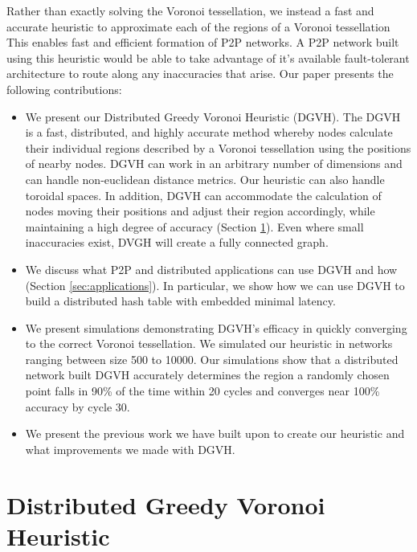 \documentclass[11pt, conference, letterpaper]{IEEEtran}
\begin{document}
Rather than exactly solving the Voronoi tessellation, we instead a fast and accurate heuristic to approximate each of the regions of a Voronoi tessellation
This enables fast and efficient formation of P2P networks.
A P2P network built using this heuristic would be able to take advantage of it's available fault-tolerant architecture to route along any inaccuracies that arise.
Our paper presents the following contributions:
\begin{itemize}
	\item We present our Distributed Greedy Voronoi Heuristic (DGVH). 
	The DGVH is a fast, distributed, and highly accurate method whereby nodes calculate their individual regions described by a Voronoi tessellation using the positions of nearby nodes.
	DGVH can work in an arbitrary number of dimensions and can handle non-euclidean distance metrics.
    Our heuristic can also handle toroidal spaces.
	In addition, DGVH can accommodate the calculation of nodes moving their positions and adjust their region accordingly, while maintaining a high degree of accuracy (Section \ref{sec:dgvh}).
    Even where small inaccuracies exist, DVGH will create a fully connected graph.
	\item We discuss what P2P and distributed applications can use DGVH and how  (Section \ref{sec:applications}).
	In particular, we show how we can use DGVH to build a distributed hash table with embedded minimal latency.
	\item We present simulations demonstrating DGVH's efficacy in quickly converging to the correct Voronoi tessellation.
    We simulated our heuristic in networks ranging between size 500 to 10000.
	Our simulations show that a distributed network built DGVH accurately determines the region a randomly chosen point falls in 90\% of the time within 20 cycles and converges near 100\% accuracy by cycle 30.
	\item We present the previous work we have built upon to create our heuristic and what improvements we made with DGVH.
	
\end{itemize}


\section{Distributed Greedy Voronoi Heuristic}
\label{sec:dgvh}
\end{document}
